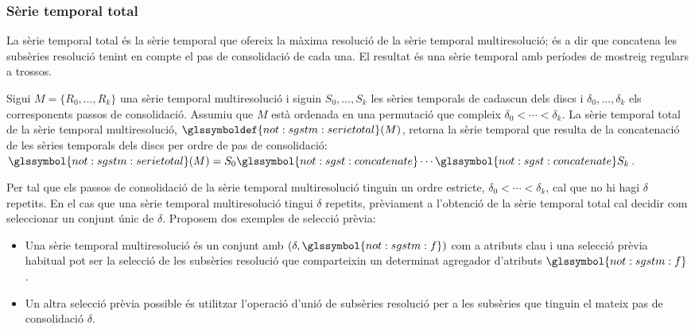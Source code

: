 \subsubsection{Sèrie temporal total}




La sèrie temporal total és la sèrie temporal que ofereix la màxima
resolució de la sèrie temporal multiresolució; és a dir que concatena
les subsèries resolució tenint en compte el pas de consolidació de
cada una. El resultat és una sèrie temporal amb períodes de mostreig
regulars a trossos.
\begin{definition}
  \label{def:sgstm:total}
  Sigui $M=\{R_0,\dotsc,R_{k}\}$ una sèrie temporal multiresolució i
  siguin $S_0,\dotsc,S_{k}$ les sèries temporals de cadascun dels
  discs i $\delta_0,\dotsc,\delta_{k}$ els corresponents passos de
  consolidació. Assumiu que $M$ està ordenada en una permutació que
  compleix $\delta_0 < \dotsb < \delta_k$.  La sèrie temporal total de la
  sèrie temporal multiresolució,
  $\glssymboldef{not:sgstm:serietotal}(M)$, retorna la sèrie temporal
  que resulta de la concatenació de les sèries temporals dels discs
  per ordre de pas de consolidació:
  $\glssymbol{not:sgstm:serietotal}(M)= S_{0}
  \glssymbol{not:sgst:concatenate} \dotsb
  \glssymbol{not:sgst:concatenate} S_{k}$.
\end{definition}

Per tal que els passos de consolidació de la sèrie temporal
multiresolució tinguin un ordre estricte, $\delta_0 < \dotsb <
\delta_k$, cal que no hi hagi $\delta$ repetits.
En el cas que una sèrie temporal
multiresolució tingui $\delta$ repetits, prèviament a l'obtenció de la
sèrie temporal total cal decidir com seleccionar un conjunt únic de
$\delta$. Proposem dos exemples de selecció prèvia:
\begin{itemize}
\item Una sèrie temporal multiresolució és un conjunt amb
  $(\delta,\glssymbol{not:sgstm:f})$ com a atributs clau i una
  selecció prèvia habitual pot ser la selecció de les subsèries
  resolució que comparteixin un determinat agregador d'atributs
  $\glssymbol{not:sgstm:f}$.
\item Un altra selecció prèvia possible és utilitzar l'operació d'unió
  de subsèries resolució per a les subsèries que tinguin el mateix pas
  de consolidació $\delta$.
\end{itemize}



